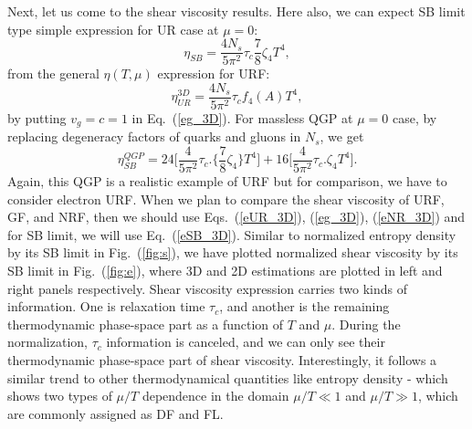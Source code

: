 \documentclass[%
 reprint,
 amsmath,amssymb,
 aps,
]{revtex4-2}
\newcommand{\be}{\begin{equation}}
\newcommand{\ee}{\end{equation}}
\begin{document}
    Next, let us come to the shear viscosity results. Here also, we can expect SB limit type simple expression for UR case at $\mu=0$:
    \be 
    \eta_{SB} = \frac{4 N_s }{5 \pi^2} \tau_c \frac{7}{8}\zeta_4 T^4,
    \label{eSB_3D}
    \ee 
    from the general $\eta(T,\mu)$ expression for URF:
    \be 
    \eta_{UR}^{3D} = \frac{4 N_s }{5 \pi^2} \tau_c f_4\left(A\right) T^4,
   \label{eUR_3D}
    \ee 
    by putting $v_g=c=1$ in Eq.~(\ref{eg_3D}).
    For massless QGP at $\mu=0$ case, by replacing degeneracy factors of quarks and gluons in $N_s$, we get 
    \be 
    \eta^{QGP}_{SB} = 24\Big[\frac{4}{5\pi^2 } \tau_c . \Big\{\frac{7}{8}\zeta_4\Big\}T^4 \Big]+16\Big[\frac{ 4}{5\pi^2 } \tau_c . \zeta_4 T^4 \Big].
    \ee
    Again, this QGP is a realistic example of URF but for comparison, we have to consider electron URF. When we plan to compare the shear viscosity of URF, GF, and NRF, then we should use Eqs.~(\ref{eUR_3D}), (\ref{eg_3D}), (\ref{eNR_3D}) and for SB limit, we will use Eq.~(\ref{eSB_3D}). Similar to normalized entropy density by its SB limit in Fig.~(\ref{fig:s}), we have plotted normalized shear viscosity by its SB limit in Fig.~(\ref{fig:e}), where 3D and 2D estimations are plotted in left and right panels respectively. Shear viscosity expression carries two kinds of information. One is relaxation time $\tau_c$, and another is the remaining thermodynamic phase-space part as a function of $T$ and $\mu$. During the normalization, $\tau_c$ information is canceled, and we can only see their thermodynamic phase-space part of shear viscosity. Interestingly, it follows a similar trend to other thermodynamical quantities like entropy density - which shows two types of $\mu/T$ dependence in the domain $\mu/T\ll 1$ and $\mu/T\gg 1$, which are commonly assigned as DF and FL.
\end{document}
